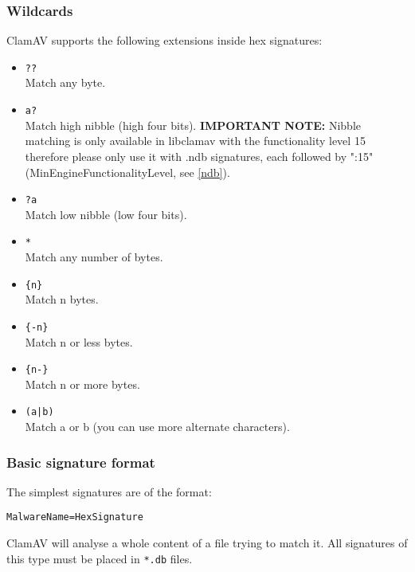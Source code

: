 \documentclass[a4paper,titlepage,12pt]{article}
\begin{document}
    \subsubsection{Wildcards}
    ClamAV supports the following extensions inside hex signatures:
    \begin{itemize}
	\item \verb+??+\\
	Match any byte.
	\item \verb+a?+\\
	Match high nibble (high four bits). \textbf{IMPORTANT NOTE:} Nibble
	matching is only available in libclamav with the functionality level
	15 therefore please only use it with .ndb signatures, each followed
	by ":15" (MinEngineFunctionalityLevel, see \ref{ndb}).
	\item \verb+?a+\\
	Match low nibble (low four bits).
	\item \verb+*+\\
	Match any number of bytes.
	\item \verb+{n}+\\
	Match n bytes.
	\item \verb+{-n}+\\
	Match n or less bytes.
	\item \verb+{n-}+\\
	Match n or more bytes.
	\item \verb+(a|b)+\\
	Match a or b (you can use more alternate characters).
    \end{itemize}

    \subsubsection{Basic signature format}
    The simplest signatures are of the format:
    \begin{verbatim}
MalwareName=HexSignature
    \end{verbatim}
    ClamAV will analyse a whole content of a file trying to match it. All
    signatures of this type must be placed in \verb+*.db+ files.
\end{document}
